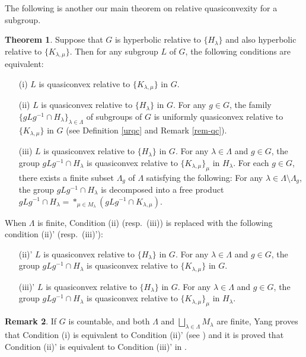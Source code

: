 \documentclass{amsart}
\theoremstyle{definition}
\newtheorem{Thm}{Theorem}[section]
\newtheorem{Rem}[Thm]{Remark}
\begin{document}
The following is another our main theorem on relative quasiconvexity for a subgroup. 

\begin{Thm}\label{qc-updown}
Suppose that $G$ is hyperbolic relative to $\{H_\lambda \}$ and also hyperbolic relative to $\{K_{\lambda, \mu}\}$. 
Then for any subgroup $L$ of $G$, the following conditions are equivalent:
\begin{enumerate}
\item[(i)] $L$ is quasiconvex relative to $\{K_{\lambda, \mu}\}$ in $G$.
\item[(ii)] $L$ is quasiconvex relative to $\{H_\lambda \}$ in $G$. 
For any $g\in G$, the family $\{gLg^{-1} \cap H_\lambda\}_{\lambda\in\Lambda}$ of subgroups of $G$ is uniformly quasiconvex relative to $\{K_{\lambda,\mu}\}$ in $G$ (see Definition \ref{urqc} and Remark \ref{rem-qc}). 
\item[(iii)] $L$ is quasiconvex relative to $\{H_\lambda \}$ in $G$. 
For any $\lambda\in\Lambda$ and $g\in G$, the group $gLg^{-1}\cap H_\lambda$ is quasiconvex relative to $\{K_{\lambda,\mu}\}_\mu$ in $H_\lambda$. 
For each $g\in G$, there exists a finite subset $\Lambda_g$ of $\Lambda$ satisfying the following:
For any $\lambda\in \Lambda \setminus \Lambda_g$, the group $gLg^{-1}\cap H_\lambda$ is decomposed into a free product $gLg^{-1}\cap H_\lambda=\ast_{\mu\in M_\lambda}(gLg^{-1}\cap K_{\lambda,\mu})$. 
\end{enumerate}
When $\Lambda$ is finite, Condition (ii) (resp.\ (iii)) is replaced with the following condition (ii)' (resp.\ (iii)'):
\begin{enumerate}
\item[(ii)'] $L$ is quasiconvex relative to $\{H_\lambda\}$ in $G$. 
For any $\lambda\in\Lambda$ and $g\in G$, the group $gLg^{-1}\cap H_\lambda$ is quasiconvex relative to $\{K_{\lambda,\mu}\}$ in $G$. 
\item[(iii)'] $L$ is quasiconvex relative to $\{H_\lambda \}$ in $G$. 
For any $\lambda\in\Lambda$ and $g\in G$, the group $gLg^{-1}\cap H_\lambda$ is quasiconvex relative to $\{K_{\lambda,\mu}\}_\mu$ in $H_\lambda$. 
\end{enumerate}
\end{Thm}

\begin{Rem}
If $G$ is countable, and both $\Lambda$ and $\bigsqcup_{\lambda\in\Lambda}M_\lambda$ are finite, Yang proves that Condition (i) is equivalent to Condition (ii)' (see \cite[Theorem 1.3]{Yan11}) and it is proved that Condition (ii)' is equivalent to Condition (iii)' in \cite[Proposition 5.1]{M-O-Y3}. 
\end{Rem} 
\end{document}
